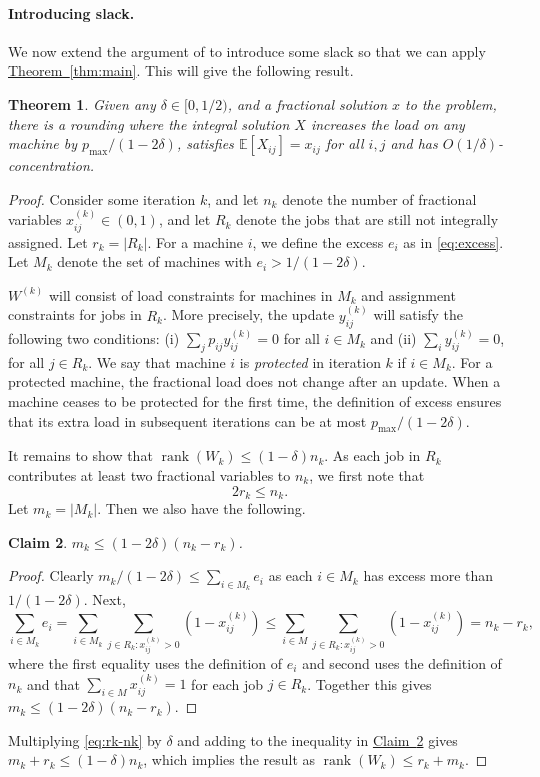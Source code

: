 \documentclass[11pt]{article}
\newcommand{\rank}{\operatorname{rank}}
\newcommand{\E}{\mathbb{E}}
\newtheorem{theorem}{Theorem}[section]
\newtheorem{claim}[theorem]{Claim}
\theoremstyle{definition}
\newcommand{\expref}[2]{\texorpdfstring{\hyperref[#2]{#1~\ref{#2}}}{#1~\ref{#2}}}
\begin{document}
\paragraph{Introducing slack.} We now extend the argument of \cite{Lau-book} to introduce some slack so that we can apply \expref{Theorem}{thm:main}. This will give the  following result.
\begin{theorem}
\label{thm:lst}
Given any $\delta \in [0,1/2)$, and a fractional solution $x$ to the problem, there is a rounding where the integral solution $X$ increases the load on any machine by $p_{\max}/(1-2\delta)$,  satisfies  $\E[X_{ij}]=x_{ij}$ for all $i,j$ and has $O(1/\delta)$-concentration.
\end{theorem}
\begin{proof}
%
Consider some iteration $k$,
and let $n_k$ denote the number of fractional variables $x^{(k)}_{ij} \in (0,1)$, and let $R_k$ denote the jobs that are still not integrally assigned. Let $r_k=|R_k|$.
For a machine $i$, we define the excess $e_i$ as in \eqref{eq:excess}. Let $M_k$ denote the set of machines with $e_i > 1/(1-2 \delta)$.

$W^{(k)}$ will consist of load constraints for machines in $M_k$ and assignment constraints for jobs in $R_k$. More precisely, the update $y^{(k)}_{ij}$ will satisfy the following two conditions:
(i) $ \sum_j p_{ij} y^{(k)}_{ij} = 0$   for all $i \in M_k$ and (ii)
$ \sum_i y^{(k)}_{ij}  = 0$, for all $j \in R_k$.
We say that machine $i$ is \emph{protected} in iteration $k$ if $i \in M_k$. For a protected machine, the fractional load does not change after an update.
%
%
%
When a machine ceases to be protected for the first time, the definition of excess ensures that its extra load in subsequent iterations can be at most $p_{\max}/(1-2\delta)$.

It remains to show that $\rank(W_k) \leq (1-\delta) n_k$.
As each job in $R_k$ contributes at least two fractional variables to $n_k$, we first note that
\begin{equation}
    \label{eq:rk-nk}2r_k \leq n_k.
\end{equation}
Let $m_k = |M_k|$. Then we also have the following.
\begin{claim}
\label{cl:mknkrk}
$m_k \leq (1-2\delta) (n_k-r_k)$.
\end{claim}
\begin{proof}
Clearly $m_k/(1-2\delta) \leq \sum_{i \in M_k}  e_i$  as each  $i\in M_k$ has excess more than $1/(1-2\delta)$.
Next,
\[   \sum_{i \in M_k} e_i =   \sum_{i \in M_k} \sum_{j \in R_k: x^{(k)}_{ij}>0}  (1-x^{(k)}_{ij}) \leq   \sum_{i \in M} \sum_{j \in R_k: x^{(k)}_{ij}>0}  (1-x^{(k)}_{ij})  = n_k -r_k,\]
where the first equality uses the definition of $e_i$ and second uses the definition of $n_k$ and that $\sum_{i  \in M} x^{(k)}_{ij} =1$ for each job $j \in R_k$.  
Together this gives $m_k \leq (1-2\delta)(n_k-r_k)$.
\end{proof}
Multiplying \eqref{eq:rk-nk} by $\delta$ and adding to the inequality in \expref{Claim}{cl:mknkrk} gives $  m_k + r_k \leq (1-\delta) n_k$, which implies the result as $\rank(W_k) \leq r_k +m_k$.
\end{proof}
\end{document}
